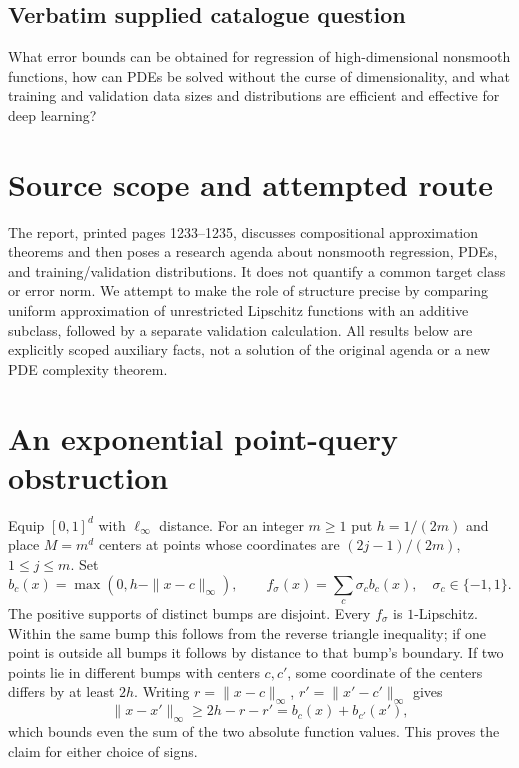 \documentclass[11pt]{article}
\begin{document}
\subsection{Verbatim supplied catalogue question}
What error bounds can be obtained for regression of high-dimensional nonsmooth functions, how can PDEs be solved without the curse of dimensionality, and what training and validation data sizes and distributions are efficient and effective for deep learning?

\section{Source scope and attempted route}
The report, printed pages 1233--1235, discusses compositional
approximation theorems and then poses a research agenda about
nonsmooth regression, PDEs, and training/validation distributions.
It does not quantify a common target class or error norm. We
attempt to make the role of structure precise by comparing
uniform approximation of unrestricted Lipschitz functions with an
additive subclass, followed by a separate validation calculation.
All results below are explicitly scoped auxiliary facts, not a
solution of the original agenda or a new PDE complexity theorem.

\section{An exponential point-query obstruction}
Equip $[0,1]^d$ with $\ell_\infty$ distance. For an integer $m\ge1$
put $h=1/(2m)$ and place $M=m^d$ centers at points whose
coordinates are $(2j-1)/(2m)$, $1\le j\le m$. Set
\[
 b_c(x)=\max(0,h-\|x-c\|_\infty),\qquad
 f_\sigma(x)=\sum_c\sigma_c b_c(x),\quad \sigma_c\in\{-1,1\}.
\]
The positive supports of distinct bumps are disjoint. Every
$f_\sigma$ is $1$-Lipschitz. Within the same bump this follows
from the reverse triangle inequality; if one point is outside all
bumps it follows by distance to that bump's boundary. If two
points lie in different bumps with centers $c,c'$, some coordinate
of the centers differs by at least $2h$. Writing
$r=\|x-c\|_\infty$, $r'=\|x'-c'\|_\infty$ gives
\[
 \|x-x'\|_\infty\ge2h-r-r'=b_c(x)+b_{c'}(x'),
\]
which bounds even the sum of the two absolute function values.
This proves the claim for either choice of signs.
\end{document}
